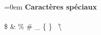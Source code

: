 \documentclass{article}
\begin{document}
\parindent=0em
\textbf{Caractères spéciaux} \\ \\
\$
\&
\%
\#
\_
\{
\}
\
\^
\textbackslash{}
\end{document}
